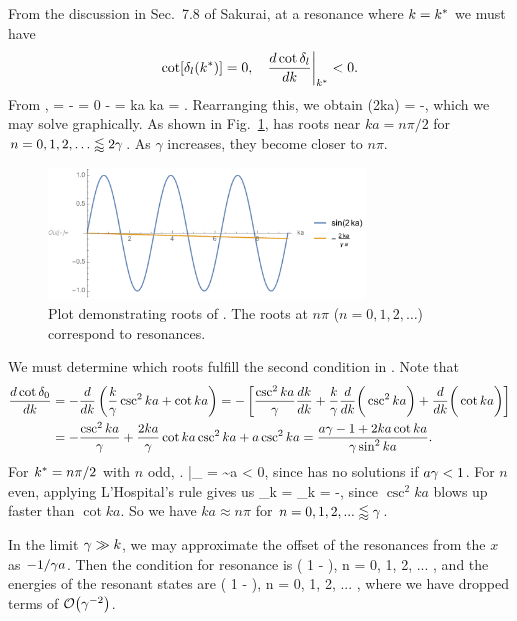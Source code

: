 \begin{solution}
	From the discussion in Sec.~7.8 of Sakurai, at a resonance where $k = k^*$ we must have
	\begin{align} \label{conds}
		\cot[\delta_l(k^*)] &= 0, &
		\left. \dv{\cot\delta_l}{k} \right|_{k^*} < 0.
	\end{align}
	From ,
	\beq
		\cot\delo = - = 0
		\qimplies
		- = \sin ka \cos ka = .
	\eeq
	Rearranging this, we obtain
	\beqn \label{thingy}
		\sin(2ka) = -,
	\eeqn
	which we may solve graphically.  As shown in Fig.~\ref{plot3},  has roots near $ka = n \pi / 2$ for $n = 0, 1, 2, \ldots \lessapprox 2\gamma$.  As $\gamma$ increases, they become closer to $n\pi$.
	
	\begin{figure} \centering
		\includegraphics[width=0.75\textwidth]{plot3}
		\caption{Plot demonstrating roots of .  The roots at $n \pi$ ($n = 0, 1, 2, \ldots$) correspond to resonances.}
		\label{plot3}
	\end{figure}
	
	We must determine which roots fulfill the second condition in .  Note that
	\begin{align}
		\dv{\cot\delta_0}{k} &= -\dv{k} \left( \frac{k}{\gamma} \csc^2 ka + \cot ka \right)
		= -\left[ \frac{\csc^2 ka}{\gamma} \dv{k}{k} + \frac{k}{\gamma} \dv{k} \bigg( \csc^2 ka \bigg) + \dv{k} \bigg( \cot ka \bigg) \right] \notag \\
		&=  -\frac{\csc^2 ka}{\gamma} + \frac{2 ka}{\gamma} \cot ka \csc^2 ka + a \csc^2 ka
		= \frac{a\gamma - 1 + 2 ka \cot ka}{\gamma \sin^2 ka}. \label{delder}
	\end{align}
	For $k^* = n\pi/2$ with $n$ odd,
	\beq
		\left.  \right|_{\ks} =  \sim a \not< 0,
	\eeq
	since  has no solutions if $a \gamma < 1$.  For $n$ even, applying L'Hospital's rule gives us
	\beq
		\lim_{k \to \ks}  = \lim_{k \to \ks}  = -\infty,
	\eeq
	since $\csc^2 ka$ blows up faster than $\cot ka$.  So we have $ka \approx n\pi$ for $n = 0, 1, 2, ... \lessapprox \gamma$.
	
	In the limit $\gamma \gg k$, we may approximate the offset of the resonances from the $x$ as $-1 / \gamma a$.  Then the condition for resonance is
	\beq
		\kn \approx {} \left( 1 -  \right), \quad n = 0, 1, 2, ... \lessapprox \gam,
	\eeq
	and the energies of the resonant states are
	\beq
		\En \approx {} \left( 1 -  \right), \quad n = 0, 1, 2, ... \lessapprox \gam,
	\eeq
	where we have dropped terms of $\order{\gam^{-2}}$.
\end{solution}
